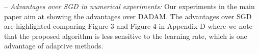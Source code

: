 \documentclass{article}
\begin{document}
-- \textit{Advantages over SGD in numerical experiments:}
Our experiments in the main paper aim at showing the advantages over DADAM. 
The advantages over SGD are highlighted comparing Figure 3 and Figure 4 in Appendix D where we note that the proposed algorithm is less sensitive to the learning rate, which is one advantage of adaptive methods.\vspace{-5pt}




\end{document}
